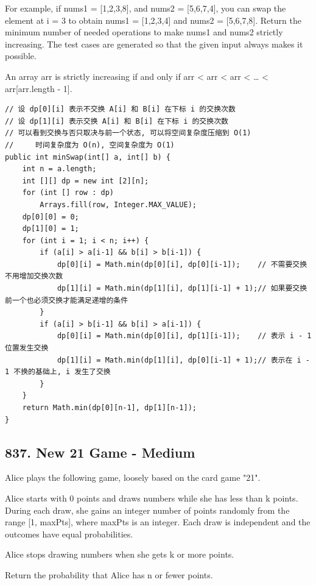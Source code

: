\documentclass[9pt, b5paaper]{book}
\begin{document}
For example, if nums1 = [1,2,3,8], and nums2 = [5,6,7,4], you can swap the element at i = 3 to obtain nums1 = [1,2,3,4] and nums2 = [5,6,7,8].
Return the minimum number of needed operations to make nums1 and nums2 strictly increasing. The test cases are generated so that the given input always makes it possible.

An array arr is strictly increasing if and only if arr\footnotemark[1]{} < arr\footnotemark[2]{} < arr\footnotemark[3]{} < \ldots{} < arr[arr.length - 1].
\begin{verbatim}
// 设 dp[0][i] 表示不交换 A[i] 和 B[i] 在下标 i 的交换次数
// 设 dp[1][i] 表示交换 A[i] 和 B[i] 在下标 i 的交换次数
// 可以看到交换与否只取决与前一个状态, 可以将空间复杂度压缩到 O(1)
//     时间复杂度为 O(n), 空间复杂度为 O(1)
public int minSwap(int[] a, int[] b) {
    int n = a.length;
    int [][] dp = new int [2][n];
    for (int [] row : dp) 
        Arrays.fill(row, Integer.MAX_VALUE);
    dp[0][0] = 0;
    dp[1][0] = 1;
    for (int i = 1; i < n; i++) {
        if (a[i] > a[i-1] && b[i] > b[i-1]) {
            dp[0][i] = Math.min(dp[0][i], dp[0][i-1]);    // 不需要交换不用增加交换次数
            dp[1][i] = Math.min(dp[1][i], dp[1][i-1] + 1);// 如果要交换前一个也必须交换才能满足递增的条件
        }
        if (a[i] > b[i-1] && b[i] > a[i-1]) {
            dp[0][i] = Math.min(dp[0][i], dp[1][i-1]);    // 表示 i - 1 位置发生交换  
            dp[1][i] = Math.min(dp[1][i], dp[0][i-1] + 1);// 表示在 i - 1 不换的基础上, i 发生了交换 
        }
    }
    return Math.min(dp[0][n-1], dp[1][n-1]);
}
\end{verbatim}
\subsection{837. New 21 Game - Medium}
\label{sec-1-4-52}
Alice plays the following game, loosely based on the card game "21".

Alice starts with 0 points and draws numbers while she has less than k points. During each draw, she gains an integer number of points randomly from the range [1, maxPts], where maxPts is an integer. Each draw is independent and the outcomes have equal probabilities.

Alice stops drawing numbers when she gets k or more points.

Return the probability that Alice has n or fewer points.
\end{document}
